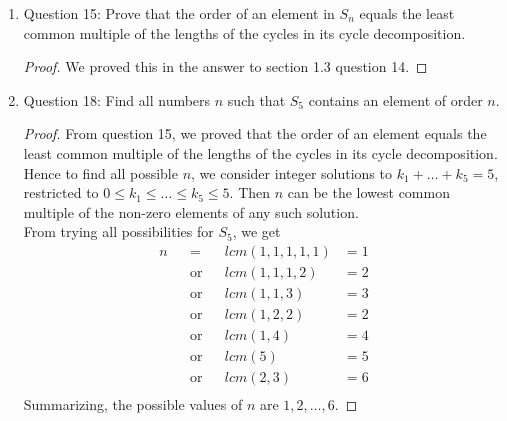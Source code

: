 \documentclass{article}
\begin{document}
\begin{enumerate}
\begin{enumerate}
\begin{proof}
          $\sigma = (1,2)(3,4,5)$ is an explicit example of an element
          in $S_n$ that does not have a prime order. This element has order
          $|(1,2)|\cdot |(3,4,5)| = 2\cdot 3 = 6$, which is not prime.
        \end{proof}
      \item Question 15: Prove that the order of an element in $S_n$ equals
        the least common multiple of the lengths of the cycles in its cycle
        decomposition.
        \begin{proof}
          We proved this in the answer to section 1.3 question 14. 
        \end{proof}
      \item Question 18: Find all numbers $n$ such that $S_5$ contains an
        element of order $n$.
        \begin{proof}
          From question 15, we proved that the order of an element equals
          the least common multiple of the lengths of the cycles in its
          cycle decomposition. Hence to find all possible $n$, we consider
          integer solutions to $k_1+\ldots+k_5=5$, restricted to $0\leq
          k_1\leq\ldots\leq k_5\leq 5$. Then $n$ can be the lowest common
          multiple of the non-zero elements of any such solution. \\

          From trying all possibilities for $S_5$, we get
          \begin{align*}
            n && =         && lcm(1,1,1,1,1)  & = 1 \\
              && \text{or} && lcm(1,1,1,2)    & = 2 \\
              && \text{or} && lcm(1,1,3)      & = 3 \\
              && \text{or} && lcm(1,2,2)      & = 2 \\
              && \text{or} && lcm(1,4)        & = 4 \\
              && \text{or} && lcm(5)          & = 5 \\
              && \text{or} && lcm(2,3)        & = 6 \\
          \end{align*}
          Summarizing, the possible values of $n$ are $1,2,\ldots,6$.
        \end{proof}
    \end{enumerate}


\end{enumerate}
\end{document}
